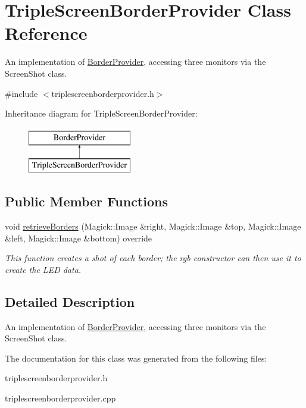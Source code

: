 \hypertarget{classTripleScreenBorderProvider}{}\section{Triple\+Screen\+Border\+Provider Class Reference}
\label{classTripleScreenBorderProvider}


An implementation of \hyperlink{classBorderProvider}{Border\+Provider}, accessing three monitors via the Screen\+Shot class.  




{\ttfamily \#include $<$triplescreenborderprovider.\+h$>$}

Inheritance diagram for Triple\+Screen\+Border\+Provider\+:\begin{figure}[H]
\begin{center}
\leavevmode
\includegraphics[height=2.000000cm]{classTripleScreenBorderProvider}
\end{center}
\end{figure}
\subsection*{Public Member Functions}
\begin{DoxyCompactItemize}
\item 
void \hyperlink{classTripleScreenBorderProvider_a045ee7528bf524af4b8fe48267a0cc9a}{retrieve\+Borders} (Magick\+::\+Image \&right, Magick\+::\+Image \&top, Magick\+::\+Image \&left, Magick\+::\+Image \&bottom) override\hypertarget{classTripleScreenBorderProvider_a045ee7528bf524af4b8fe48267a0cc9a}{}\label{classTripleScreenBorderProvider_a045ee7528bf524af4b8fe48267a0cc9a}

\begin{DoxyCompactList}\small\item\em This function creates a shot of each border; the rgb constructor can then use it to create the L\+ED data. \end{DoxyCompactList}\end{DoxyCompactItemize}


\subsection{Detailed Description}
An implementation of \hyperlink{classBorderProvider}{Border\+Provider}, accessing three monitors via the Screen\+Shot class. 

The documentation for this class was generated from the following files\+:\begin{DoxyCompactItemize}
\item 
triplescreenborderprovider.\+h\item 
triplescreenborderprovider.\+cpp\end{DoxyCompactItemize}
